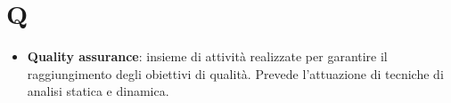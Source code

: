 \section{Q}
\begin{itemize} 
	\item
	\textbf{Quality assurance}: insieme di attività realizzate per garantire il raggiungimento degli obiettivi di qualità. Prevede l'attuazione di tecniche di analisi statica e dinamica.	
\end{itemize}